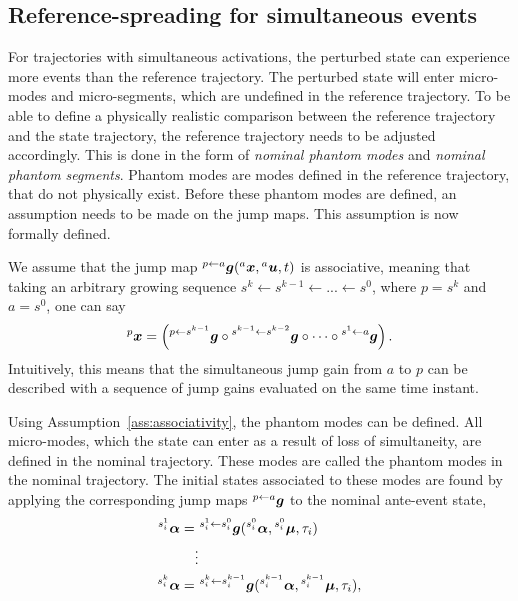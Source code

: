 \documentclass[../DC2017114Bouma.tex]{subfiles}
\begin{document}
\subsection{Reference-spreading for simultaneous events}
For trajectories with simultaneous activations, the perturbed state can experience more events than the reference trajectory. The perturbed state will enter micro-modes and micro-segments, which are undefined in the reference trajectory. To be able to define a physically realistic comparison between the reference trajectory and the state trajectory, the reference trajectory needs to be adjusted accordingly. This is done in the form of \textit{nominal phantom modes} and \textit{nominal phantom segments}. Phantom modes are modes defined in the reference trajectory, that do not physically exist. Before these phantom modes are defined, an assumption needs to be made on the jump maps. This assumption is now formally defined.
\begin{myass}\label{ass:associativity}
We assume that the jump map $\hspace{0cm}^{p\leftarrow a}{\boldsymbol{g}}(\hspace{0cm}^{a}{\boldsymbol{x}},\hspace{0cm}^{a}{\boldsymbol{u}},t)$ is associative, meaning that taking an arbitrary growing sequence $s^k\leftarrow s^{k-1} \leftarrow ... \leftarrow s^0$, where $p = s^k$ and $a = s^0$, one can say
\begin{align}
\hspace{0cm}^{p}{\boldsymbol{x}} = \left(\hspace{0cm}^{p\leftarrow s^{k-1}}{\boldsymbol{g}} \circ \hspace{0cm}^{s^{k-1} \leftarrow s^{k-2}}{\boldsymbol{g}} \circ \cdots \circ \hspace{0cm}^{s^1 \leftarrow a}{\boldsymbol{g}} \right).
\end{align}
Intuitively, this means that the simultaneous jump gain from $a$ to $p$ can be described with a sequence of jump gains evaluated on the same time instant.
\end{myass}
Using Assumption~\ref{ass:associativity}, the phantom modes can be defined. All micro-modes, which the state can enter as a result of loss of simultaneity, are defined in the nominal trajectory. These modes are called the phantom modes in the nominal trajectory. The initial states associated to these modes are found by applying the corresponding jump maps $\hspace{0cm}^{p\leftarrow a}{\boldsymbol{g}}$ to the nominal ante-event state,
\begin{align}
\hspace{0cm}^{s_i^1}\boldsymbol{\alpha} =&\ \hspace{0cm}^{s_i^1\leftarrow s_i^0}{\boldsymbol{g}}(\hspace{0cm}^{s_i^0}\boldsymbol{\alpha},\hspace{0cm}^{s_i^0}\boldsymbol{\mu},\tau_i)\nonumber\\
&\vdots\label{eq:4phantomini}\\
\hspace{0cm}^{s_i^{k}}\boldsymbol{\alpha} =&\ \hspace{0cm}^{s_i^k\leftarrow s_i^{k-1}}{\boldsymbol{g}}(\hspace{0cm}^{s_i^{k-1}}\boldsymbol{\alpha},\hspace{0cm}^{s_i^{k-1}}\boldsymbol{\mu},\tau_i),\nonumber
\end{align}
\end{document}
